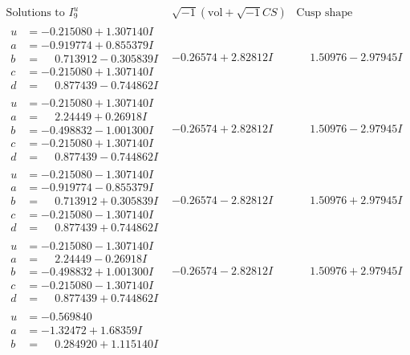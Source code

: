 \documentclass[1p]{elsarticle_modified}
\theoremstyle{definition}
\newcommand{\I}{\sqrt{-1}}
\begin{document}
$$\begin{array}{c|c|c}  
\text{Solutions to }I^u_{9}& \I (\text{vol} + \sqrt{-1}CS) & \text{Cusp shape}\\
 \hline 
\begin{aligned}
u &= -0.215080 + 1.307140 I \\
a &= -0.919774 + 0.855379 I \\
b &= \phantom{-}0.713912 - 0.305839 I \\
c &= -0.215080 + 1.307140 I \\
d &= \phantom{-}0.877439 - 0.744862 I\end{aligned}
 & -0.26574 + 2.82812 I & \phantom{-}1.50976 - 2.97945 I \\ \hline\begin{aligned}
u &= -0.215080 + 1.307140 I \\
a &= \phantom{-}2.24449 + 0.26918 I \\
b &= -0.498832 - 1.001300 I \\
c &= -0.215080 + 1.307140 I \\
d &= \phantom{-}0.877439 - 0.744862 I\end{aligned}
 & -0.26574 + 2.82812 I & \phantom{-}1.50976 - 2.97945 I \\ \hline\begin{aligned}
u &= -0.215080 - 1.307140 I \\
a &= -0.919774 - 0.855379 I \\
b &= \phantom{-}0.713912 + 0.305839 I \\
c &= -0.215080 - 1.307140 I \\
d &= \phantom{-}0.877439 + 0.744862 I\end{aligned}
 & -0.26574 - 2.82812 I & \phantom{-}1.50976 + 2.97945 I \\ \hline\begin{aligned}
u &= -0.215080 - 1.307140 I \\
a &= \phantom{-}2.24449 - 0.26918 I \\
b &= -0.498832 + 1.001300 I \\
c &= -0.215080 - 1.307140 I \\
d &= \phantom{-}0.877439 + 0.744862 I\end{aligned}
 & -0.26574 - 2.82812 I & \phantom{-}1.50976 + 2.97945 I \\ \hline\begin{aligned}
u &= -0.569840\phantom{ +0.000000I} \\
a &= -1.32472 + 1.68359 I \\
b &= \phantom{-}0.284920 + 1.115140 I \\

\end{aligned}
\end{array}$$
\end{document}
